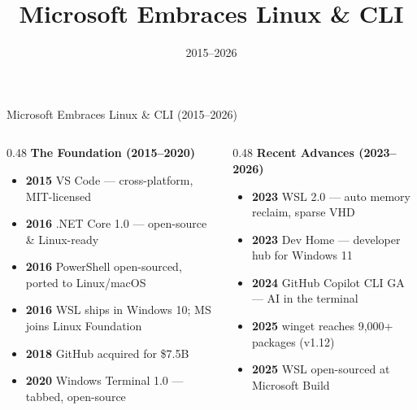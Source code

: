 \documentclass{beamer}
\title{Microsoft Embraces Linux \& CLI}
\date{2015--2026}
\begin{document}
\begin{frame}{Microsoft Embraces Linux \& CLI (2015--2026)}
  \begin{columns}[T]
    \begin{column}{0.48\textwidth}
      \textbf{\small The Foundation (2015--2020)}
      \begin{itemize}\small
        \item \textbf{2015} VS Code --- cross-platform, MIT-licensed
        \item \textbf{2016} .NET Core 1.0 --- open-source \& Linux-ready
        \item \textbf{2016} PowerShell open-sourced, ported to Linux/macOS
        \item \textbf{2016} WSL ships in Windows 10; MS joins Linux Foundation
        \item \textbf{2018} GitHub acquired for \$7.5B
        \item \textbf{2020} Windows Terminal 1.0 --- tabbed, open-source
      \end{itemize}
    \end{column}
    \begin{column}{0.48\textwidth}
      \textbf{\small Recent Advances (2023--2026)}
      \begin{itemize}\small
        \item \textbf{2023} WSL 2.0 --- auto memory reclaim, sparse VHD
        \item \textbf{2023} Dev Home --- developer hub for Windows 11
        \item \textbf{2024} GitHub Copilot CLI GA --- AI in the terminal
        \item \textbf{2025} winget reaches 9,000+ packages (v1.12)
        \item \textbf{2025} WSL open-sourced at Microsoft Build
      \end{itemize}
    \end{column}
  \end{columns}
\end{frame}
\end{document}
